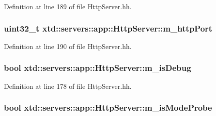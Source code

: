 Definition at line 189 of file Http\+Server.\+hh.

\subsubsection[{\texorpdfstring{m\+\_\+http\+Port}{m_httpPort}}]{\setlength{\rightskip}{0pt plus 5cm}uint32\+\_\+t xtd\+::servers\+::app\+::\+Http\+Server\+::m\+\_\+http\+Port\hspace{0.3cm}{\ttfamily [protected]}}\hypertarget{classxtd_1_1servers_1_1app_1_1HttpServer_a75ed3bcfa895cad365f6bf0955efcf9e}{}\label{classxtd_1_1servers_1_1app_1_1HttpServer_a75ed3bcfa895cad365f6bf0955efcf9e}


Definition at line 190 of file Http\+Server.\+hh.

\subsubsection[{\texorpdfstring{m\+\_\+is\+Debug}{m_isDebug}}]{\setlength{\rightskip}{0pt plus 5cm}bool xtd\+::servers\+::app\+::\+Http\+Server\+::m\+\_\+is\+Debug\hspace{0.3cm}{\ttfamily [protected]}}\hypertarget{classxtd_1_1servers_1_1app_1_1HttpServer_ae8b1e546b8f464e0a18c6b737ed82df8}{}\label{classxtd_1_1servers_1_1app_1_1HttpServer_ae8b1e546b8f464e0a18c6b737ed82df8}


Definition at line 178 of file Http\+Server.\+hh.

\subsubsection[{\texorpdfstring{m\+\_\+is\+Mode\+Probe}{m_isModeProbe}}]{\setlength{\rightskip}{0pt plus 5cm}bool xtd\+::servers\+::app\+::\+Http\+Server\+::m\+\_\+is\+Mode\+Probe\hspace{0.3cm}{\ttfamily [protected]}}\hypertarget{classxtd_1_1servers_1_1app_1_1HttpServer_a3ae2e35fc931b303e244b01e277cb8dd}{}\label{classxtd_1_1servers_1_1app_1_1HttpServer_a3ae2e35fc931b303e244b01e277cb8dd}


